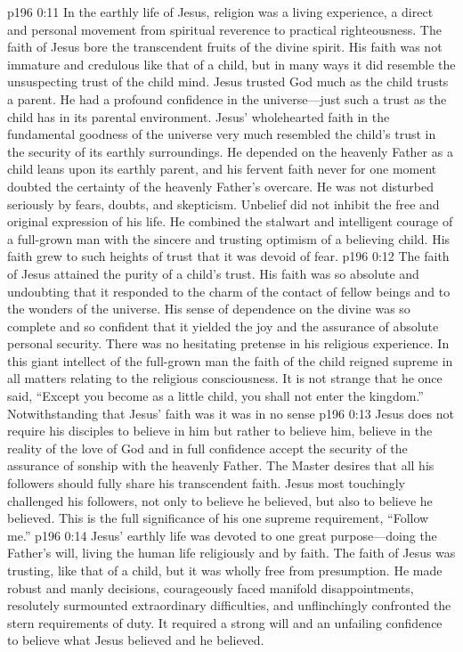 \vs p196 0:11 In the earthly life of Jesus, religion was a living experience, a direct and personal movement from spiritual reverence to practical righteousness. The faith of Jesus bore the transcendent fruits of the divine spirit. His faith was not immature and credulous like that of a child, but in many ways it did resemble the unsuspecting trust of the child mind. Jesus trusted God much as the child trusts a parent. He had a profound confidence in the universe---just such a trust as the child has in its parental environment. Jesus’ wholehearted faith in the fundamental goodness of the universe very much resembled the child’s trust in the security of its earthly surroundings. He depended on the heavenly Father as a child leans upon its earthly parent, and his fervent faith never for one moment doubted the certainty of the heavenly Father’s overcare. He was not disturbed seriously by fears, doubts, and skepticism. Unbelief did not inhibit the free and original expression of his life. He combined the stalwart and intelligent courage of a full\hyp{}grown man with the sincere and trusting optimism of a believing child. His faith grew to such heights of trust that it was devoid of fear.
\vs p196 0:12 The faith of Jesus attained the purity of a child’s trust. His faith was so absolute and undoubting that it responded to the charm of the contact of fellow beings and to the wonders of the universe. His sense of dependence on the divine was so complete and so confident that it yielded the joy and the assurance of absolute personal security. There was no hesitating pretense in his religious experience. In this giant intellect of the full\hyp{}grown man the faith of the child reigned supreme in all matters relating to the religious consciousness. It is not strange that he once said, \textcolor{ubdarkred}{“Except you become as a little child, you shall not enter the kingdom.”} Notwithstanding that Jesus’ faith was  it was in no sense 
\vs p196 0:13 Jesus does not require his disciples to believe in him but rather to believe  him, believe in the reality of the love of God and in full confidence accept the security of the assurance of sonship with the heavenly Father. The Master desires that all his followers should fully share his transcendent faith. Jesus most touchingly challenged his followers, not only to believe  he believed, but also to believe  he believed. This is the full significance of his one supreme requirement, \textcolor{ubdarkred}{“Follow me.”}
\vs p196 0:14 Jesus’ earthly life was devoted to one great purpose---doing the Father’s will, living the human life religiously and by faith. The faith of Jesus was trusting, like that of a child, but it was wholly free from presumption. He made robust and manly decisions, courageously faced manifold disappointments, resolutely surmounted extraordinary difficulties, and unflinchingly confronted the stern requirements of duty. It required a strong will and an unfailing confidence to believe what Jesus believed and  he believed.

